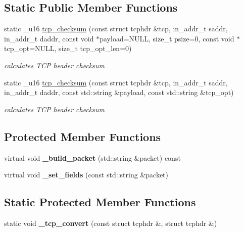 \subsection*{Static Public Member Functions}
\begin{CompactItemize}
\item 
static \_\-u16 \hyperlink{classsocketpp_1_1TCP__RawSocket_91cf9d3aaf57d50ba1e26c8621083728}{tcp\_\-checksum} (const struct tcphdr \&tcp, in\_\-addr\_\-t saddr, in\_\-addr\_\-t daddr, const void $\ast$payload=NULL, size\_\-t psize=0, const void $\ast$tcp\_\-opt=NULL, size\_\-t tcp\_\-opt\_\-len=0)
\begin{CompactList}\small\item\em calculates TCP header checksum \item\end{CompactList}\item 
static \_\-u16 \hyperlink{classsocketpp_1_1TCP__RawSocket_237a9811c114b7d38e41e9d65265b4cd}{tcp\_\-checksum} (const struct tcphdr \&tcp, in\_\-addr\_\-t saddr, in\_\-addr\_\-t daddr, const std::string \&payload, const std::string \&tcp\_\-opt)
\begin{CompactList}\small\item\em calculates TCP header checksum \item\end{CompactList}\end{CompactItemize}
\subsection*{Protected Member Functions}
\begin{CompactItemize}
\item 
\hypertarget{classsocketpp_1_1TCP__RawSocket_bc5c2885494099eb5371d8e15cfce054}{
virtual void \textbf{\_\-build\_\-packet} (std::string \&packet) const }
\label{classsocketpp_1_1TCP__RawSocket_bc5c2885494099eb5371d8e15cfce054}

\item 
\hypertarget{classsocketpp_1_1TCP__RawSocket_6976a4726503eef03a8d446afdbaddbe}{
virtual void \textbf{\_\-set\_\-fields} (const std::string \&packet)}
\label{classsocketpp_1_1TCP__RawSocket_6976a4726503eef03a8d446afdbaddbe}

\end{CompactItemize}
\subsection*{Static Protected Member Functions}
\begin{CompactItemize}
\item 
\hypertarget{classsocketpp_1_1TCP__RawSocket_d8fd5e353a5960c652bd16a51840f148}{
static void \textbf{\_\-tcp\_\-convert} (const struct tcphdr \&, struct tcphdr \&)}
\label{classsocketpp_1_1TCP__RawSocket_d8fd5e353a5960c652bd16a51840f148}

\end{CompactItemize}
